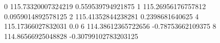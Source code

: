 0 115.73320007324219 0.559539794921875
1 115.26956176757812 0.0959014892578125
2 115.41352844238281 0.2398681640625
4 115.17366027832031 0.0
6 114.38612365722656 -0.78753662109375
8 114.86566925048828 -0.30799102783203125
